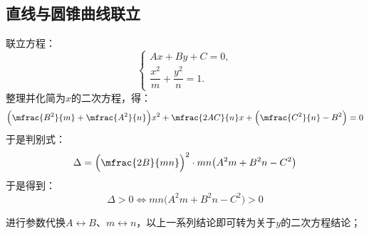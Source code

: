     \subsection{直线与圆锥曲线联立}
    联立方程：
        \begin{equation}
            \left\{\begin{aligned}
                Ax+By+C=0,\\
                \dfrac{x^2}{m}+\dfrac{y^2}{n}=1.
            \end{aligned}\right.
        \end{equation}\label{eq:eqs}
    整理并化简为$x$的二次方程，得：
        \begin{equation}
            \Bigl(\mfrac{B^2}{m}+\mfrac{A^2}{n}\Bigr)x^2+\mfrac{2AC}{n}x+\Bigl(\mfrac{C^2}{n}-B^2\Bigr)=0
        \end{equation}\label{eq:eq0}
    于是判别式：
        \begin{equation}
            \Delta=\Bigl(\mfrac{2B}{mn}\Bigr)^2\cdot mn\bigl(A^2m+B^2n-C^2\bigr)
        \end{equation}\label{eq:Delta}
    于是得到：
        \begin{equation}
            \Delta>0 \Longleftrightarrow mn\bigl(A^2m+B^2n-C^2\bigr)>0
        \end{equation}\label{eq:Delta}


        进行参数代换$A\leftrightarrow B$、$m\leftrightarrow n$，以上一系列结论即可转为关于$y$的二次方程结论；





